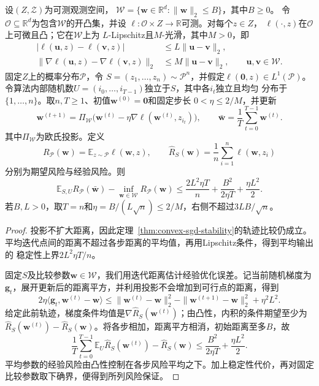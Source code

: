 \begin{theorem}[平均投影SGD的期望风险保证]
\label{thm:averaged-sgd-learning}
设$(Z,\mathcal Z)$为可测观测空间，
$\mathcal W=\{\bm w\in\mathbb R^d:\|\bm w\|_2\leq B\}$，其中$B\geq0$。
令$\mathcal O\subseteq\mathbb R^d$为包含$\mathcal W$的开凸集，并设
$\ell:\mathcal O\times Z\to\mathbb R$可测。对每个$z\in Z$，
$\ell(\cdot,z)$在$\mathcal O$上可微且凸；它在$\mathcal W$上为
$L$-Lipschitz且$M$-光滑，其中$M>0$，即
\[
\begin{aligned}
 |\ell(\bm u,z)-\ell(\bm v,z)|
 &\leq L\|\bm u-\bm v\|_2,\\
 \|\nabla\ell(\bm u,z)-\nabla\ell(\bm v,z)\|_2
 &\leq M\|\bm u-\bm v\|_2,
 \qquad \bm u,\bm v\in\mathcal W.
\end{aligned}
\]
固定$Z$上的概率分布$\mathcal P$，令
$S=(z_1,\ldots,z_n)\sim\mathcal P^n$，并假定$\ell(\bm 0,z)\in L^1(\mathcal P)$。
令算法内部随机数$U=(i_0,\ldots,i_{T-1})$独立于$S$，其中各$i_t$独立且均匀
分布于$\{1,\ldots,n\}$。取$n,T\geq1$、初值$\bm w^{(0)}=\bm 0$和固定步长
$0<\eta\leq2/M$，并更新
\[
 \bm w^{(t+1)}=\Pi_{\mathcal W}
   \bigl(\bm w^{(t)}-\eta\nabla\ell(\bm w^{(t)},z_{i_t})\bigr),
 \qquad
 \bar{\bm w}=\frac1T\sum_{t=0}^{T-1}\bm w^{(t)}.
\]
其中$\Pi_{\mathcal W}$为欧氏投影。定义
\[
 R_{\mathcal P}(\bm w)=\mathbb E_{z\sim\mathcal P}\ell(\bm w,z),
 \qquad
 \hat R_S(\bm w)=\frac1n\sum_{i=1}^n\ell(\bm w,z_i)
\]
分别为期望风险与经验风险。则
\[
 \mathbb E_{S,U}R_{\mathcal P}(\bar{\bm w})-\inf_{\bm w\in\mathcal W}R_{\mathcal P}(\bm w)
 \leq\frac{2L^2\eta T}{n}+\frac{B^2}{2\eta T}+\frac{\eta L^2}{2}.
\]
若$B,L>0$，取$T=n$和$\eta=B/(L\sqrt n)\leq2/M$，右侧不超过$3LB/\sqrt n$。
\end{theorem}
\begin{proof}
投影不扩大距离，因此定理~\ref{thm:convex-sgd-stability}的轨迹比较仍成立。
平均迭代点间的距离不超过各步距离的平均值，再用Lipschitz条件，得到平均输出的
稳定性上界$2L^2\eta T/n$。

固定$S$及比较参数$\bm w\in\mathcal W$，我们用迭代距离估计经验优化误差。记当前随机梯度为$\bm g_t$，展开更新后的距离平方，并利用投影不会增加到可行点的距离，得到
\[
 2\eta\langle\bm g_t,\bm w^{(t)}-\bm w\rangle
 \leq\|\bm w^{(t)}-\bm w\|_2^2
 -\|\bm w^{(t+1)}-\bm w\|_2^2+\eta^2L^2.
\]
给定此前轨迹，梯度条件均值是$\nabla\hat R_S(\bm w^{(t)})$；由凸性，内积的条件期望至少为$\hat R_S(\bm w^{(t)})-\hat R_S(\bm w)$。将各步相加，距离平方相消，初始距离至多$B$，故
\[
 \frac1T\sum_{t=0}^{T-1}\mathbb E_U\hat R_S(\bm w^{(t)})-\hat R_S(\bm w)
 \leq\frac{B^2}{2\eta T}+\frac{\eta L^2}{2}.
\]
平均参数的经验风险由凸性控制在各步风险平均之下。加上稳定性代价，再对固定比较参数取下确界，便得到所列风险保证。
\end{proof}

